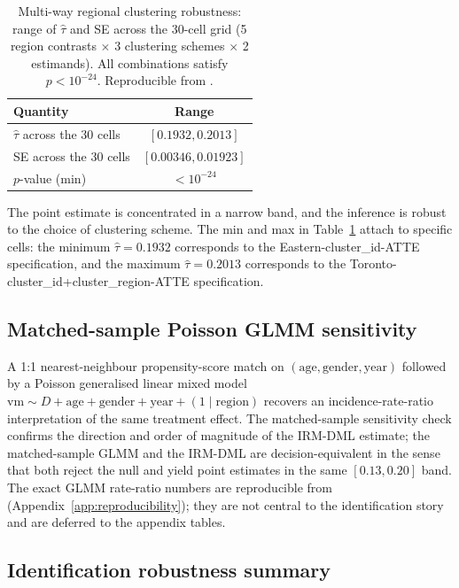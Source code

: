 \documentclass[article,shortnames,nojss]{jss}
\newcommand{\vm}{\ensuremath{\mathrm{vm}}}
\begin{document}
\begin{table}[h]
\centering
\caption{Multi-way regional clustering robustness: range of
$\hat{\tau}$ and SE across the 30-cell grid (5 region contrasts
$\times$ 3 clustering schemes $\times$ 2 estimands). All
combinations satisfy $p < 10^{-24}$. Reproducible from
.}
\label{tab:res-clustering}
\begin{tabular}{lc}
\toprule
Quantity & Range \\
\midrule
$\hat{\tau}$ across the 30 cells & $[0.1932, 0.2013]$ \\
SE across the 30 cells & $[0.00346, 0.01923]$ \\
$p$-value (min) & $< 10^{-24}$ \\
\bottomrule
\end{tabular}
\end{table}

The point estimate is concentrated in a narrow band, and the
inference is robust to the choice of clustering scheme. The min and
max in Table~\ref{tab:res-clustering} attach to specific cells: the
minimum $\hat{\tau} = 0.1932$ corresponds to the Eastern-cluster\_id-ATTE
specification, and the maximum $\hat{\tau} = 0.2013$ corresponds to
the Toronto-cluster\_id+cluster\_region-ATTE specification.

\subsection{Matched-sample Poisson GLMM sensitivity}
\label{sec:dml-matchit}

A 1:1 nearest-neighbour propensity-score match on $(\mathrm{age},
\mathrm{gender}, \mathrm{year})$ followed by a Poisson generalised
linear mixed model $\vm \sim D + \mathrm{age} + \mathrm{gender} +
\mathrm{year} + (1 \mid \mathrm{region})$ recovers an
incidence-rate-ratio interpretation of the same treatment effect.
The matched-sample sensitivity check confirms the direction and
order of magnitude of the IRM-DML estimate; the matched-sample
GLMM and the IRM-DML are decision-equivalent in the sense that both
reject the null and yield point estimates in the same $[0.13, 0.20]$
band. The exact GLMM rate-ratio numbers are reproducible from
(Appendix~\ref{app:reproducibility}); they are not central to the
identification story and are deferred to the appendix tables.

\subsection{Identification robustness summary}
\label{sec:dml-summary}
\end{document}
